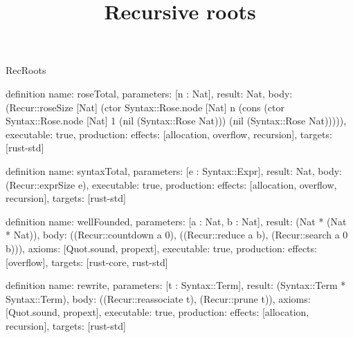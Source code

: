 \begin{lexlean}{RecRoots}
\title{Recursive roots}
\begin{semanticmodule}
definition{
  name: roseTotal,
  parameters: [n : Nat],
  result: Nat,
  body: (Recur::roseSize [Nat] (ctor Syntax::Rose.node [Nat] n (cons (ctor Syntax::Rose.node [Nat] 1 (nil (Syntax::Rose Nat))) (nil (Syntax::Rose Nat))))),
  executable: true,
  production: {effects: [allocation, overflow, recursion], targets: [rust-std]}
}

definition{
  name: syntaxTotal,
  parameters: [e : Syntax::Expr],
  result: Nat,
  body: (Recur::exprSize e),
  executable: true,
  production: {effects: [allocation, overflow, recursion], targets: [rust-std]}
}

definition{
  name: wellFounded,
  parameters: [a : Nat, b : Nat],
  result: (Nat * (Nat * Nat)),
  body: ((Recur::countdown a 0), ((Recur::reduce a b), (Recur::search a 0 b))),
  axioms: [Quot.sound, propext],
  executable: true,
  production: {effects: [overflow], targets: [rust-core, rust-std]}
}

definition{
  name: rewrite,
  parameters: [t : Syntax::Term],
  result: (Syntax::Term * Syntax::Term),
  body: ((Recur::reassociate t), (Recur::prune t)),
  axioms: [Quot.sound, propext],
  executable: true,
  production: {effects: [allocation, recursion], targets: [rust-std]}
}
\end{semanticmodule}
\end{lexlean}
